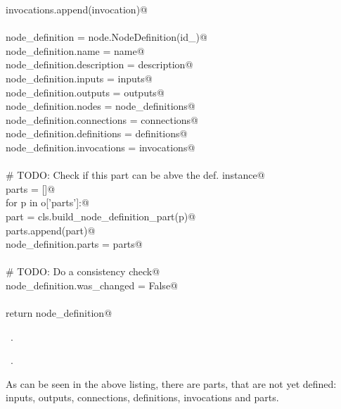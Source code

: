 \documentclass[
    a4paper,      %
    10pt,         %
    openright,    %
    notitlepage,  %
    parskip=half, %
]{scrreprt}       %
\theoremstyle{definition}                    %
\begin{document}
\begin{flushleft}
\begin{minipage}{\linewidth}
\begin{list}{}{}
\mbox{}\lstinline@        invocations.append(invocation)@\\
\mbox{}\lstinline@@\\
\mbox{}\lstinline@    node_definition             = node.NodeDefinition(id_)@\\
\mbox{}\lstinline@    node_definition.name        = name@\\
\mbox{}\lstinline@    node_definition.description = description@\\
\mbox{}\lstinline@    node_definition.inputs      = inputs@\\
\mbox{}\lstinline@    node_definition.outputs     = outputs@\\
\mbox{}\lstinline@    node_definition.nodes       = node_definitions@\\
\mbox{}\lstinline@    node_definition.connections = connections@\\
\mbox{}\lstinline@    node_definition.definitions = definitions@\\
\mbox{}\lstinline@    node_definition.invocations = invocations@\\
\mbox{}\lstinline@@\\
\mbox{}\lstinline@    # TODO: Check if this part can be abve the def. instance@\\
\mbox{}\lstinline@    parts = []@\\
\mbox{}\lstinline@    for p in o['parts']:@\\
\mbox{}\lstinline@        part = cls.build_node_definition_part(p)@\\
\mbox{}\lstinline@        parts.append(part)@\\
\mbox{}\lstinline@    node_definition.parts = parts@\\
\mbox{}\lstinline@@\\
\mbox{}\lstinline@    # TODO: Do a consistency check@\\
\mbox{}\lstinline@    node_definition.was_changed = False@\\
\mbox{}\lstinline@@\\
\mbox{}\lstinline@    return node_definition@{\NWsep}
\end{list}
\vspace{-1.5ex}
\footnotesize
\begin{list}{}{\setlength{\itemsep}{-\parsep}\setlength{\itemindent}{-\leftmargin}}
\item \NWtxtMacroDefBy\ .
\item \NWtxtMacroRefIn\ .

\item{}
\end{list}
\end{minipage}\vspace{4ex}
\end{flushleft}
As can be seen in the above listing, there are parts, that are not yet defined:
inputs, outputs, connections, definitions, invocations and parts.
\end{document}
